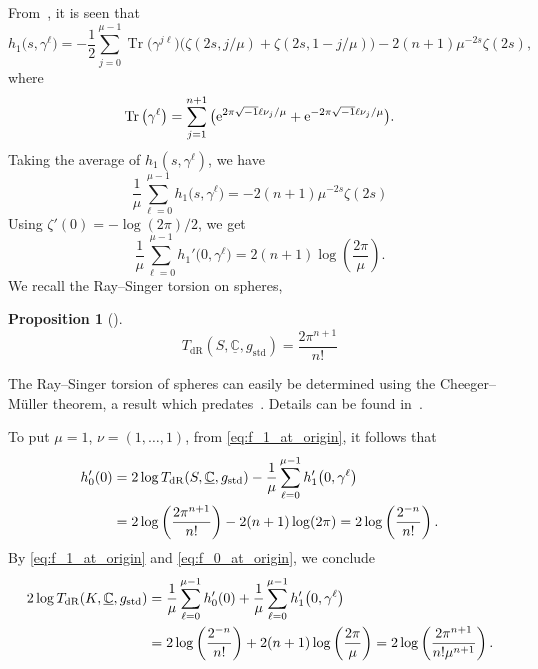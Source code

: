 \documentclass[10pt,a4paper]{amsart}
\numberwithin{equation}{section}
\newtheorem{Proposition}[Theorem]{Proposition}
 { \theoremstyle{definition}
\newtheorem{Definition}[Theorem]{Definition}
\newtheorem{Note}[Theorem]{Note}
\newtheorem{Example}[Theorem]{Example}
\newtheorem{Remark}[Theorem]{Remark} }
\DeclareMathOperator{\Tr}{Tr}
\newcommand{\ii}{\sqrt{-1}}
\newcommand{\deRham}{\mathrm{dR}}
\newcommand{\bC}{\mathbb{C}}
\begin{document}
From~\cite[p.~125]{Ray-70},
it is seen that
\begin{equation*}
 h_1 \big(s , \gamma^{\ell}\big)
 =
 - \frac{1}{2}
 \sum_{j=0}^{\mu -1}
 \Tr \big(\gamma^{j \ell}\big)
 \bigl(
 \zeta (2s , j /\mu)
 +
 \zeta (2s , 1- j /\mu)
 \bigr)
 -
 2 (n+1) \mu^{-2s} \zeta (2s)
 ,
\end{equation*}
where
\[
 \Tr \big(\gamma^{\ell}\big) =
 \sum_{j=1}^{n+1}
 \big(
 {\rm e}^{2 \pi \ii \ell \nu_j / \mu} + {\rm e}^{-2 \pi \ii \ell \nu_j / \mu}
 \big)
 .
\]
Taking the average of $h_1 (s , \gamma^{\ell})$, we have
\[
 \frac{1}{\mu} \sum_{\ell = 0}^{\mu-1} h_1 \big(s , \gamma^{\ell}\big)
 =
 - 2 (n+1)
 \mu^{-2s} \zeta (2s)
\]
Using $\zeta '(0) = - \log (2 \pi) /2$, we get
\begin{equation}
 \frac{1}{\mu} \sum_{\ell = 0}^{\mu-1} h_1 ' \big(0 , \gamma^{\ell}\big)
 = 2 (n+1) \log \left( \frac{2 \pi}{ \mu} \right)
 .
 \label{eq:f_1_at_origin}
\end{equation}
We recall the Ray--Singer torsion on spheres,
\begin{Proposition}[{\cite{Weng-You-96}}]
 \label{prop:Weng-You}
 \[
 T_{\deRham} (S, \underline{\bC} , g_{\mathrm{std}})
 = \frac{2 \pi^{n+1}}{n!}
 \]
\end{Proposition}
\begin{Remark}
 The Ray--Singer torsion of spheres can easily be determined using the Cheeger--M\"uller theorem, a result which predates~\cite{Weng-You-96}.
 Details can be found in~\cite{Melo-Spreafico-09}.
\end{Remark}
To put $\mu =1$, $\nu = (1 , \ldots , 1)$, from \eqref{eq:f_1_at_origin}, it follows that
\begin{align}
 h_0' (0)
 & =
 2 \log T_{\deRham} (S, \underline{\bC} , g_{\mathrm{std}})
 - \frac{1}{\mu} \sum_{\ell = 0}^{\mu-1} h_1 ' \big(0 , \gamma^{\ell}\big)
 \notag \\
 & =
 2 \log \left( \frac{2 \pi^{n+1}}{ n!} \right)
 - 2 (n+1) \log ( 2 \pi )
 = 2 \log \left( \frac{2^{-n}}{ n!} \right)
 .
 \label{eq:f_0_at_origin}
\end{align}
By \eqref{eq:f_1_at_origin} and \eqref{eq:f_0_at_origin},
we conclude
\begin{align}
 2 \log T_{\deRham} (K, \underline{\bC} , g_{\mathrm{std}})
 & =
 \frac{1}{\mu} \sum_{\ell = 0}^{\mu -1} h_0 ' (0 )
 + \frac{1}{\mu} \sum_{\ell = 0}^{\mu -1} h_1 ' \big(0 , \gamma^{\ell}\big)
 \notag \\
 & = 2 \log \left( \frac{2^{-n}}{n!} \right) + 2 (n+1) \log \left( \frac{2 \pi}{\mu} \right)
 = 2 \log \left( \frac{2 \pi^{n+1}}{ n! \mu^{n+1}} \right)
 .
 \label{eq:pre_Proposition_trivial_bundle}
\end{align}
\end{document}
